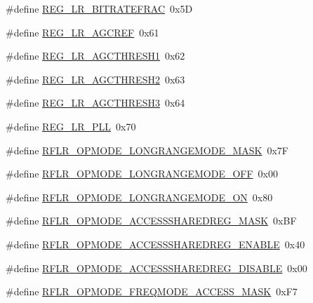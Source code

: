 \begin{DoxyCompactItemize}
\item 
\#define \mbox{\hyperlink{sx1276_regs-_lo_ra_8h_ab2660874b741525fc0424f8b0c59fb00}{R\+E\+G\+\_\+\+L\+R\+\_\+\+B\+I\+T\+R\+A\+T\+E\+F\+R\+AC}}~0x5D
\item 
\#define \mbox{\hyperlink{sx1276_regs-_lo_ra_8h_a3ad00cd303907ff68744172e6bf219c8}{R\+E\+G\+\_\+\+L\+R\+\_\+\+A\+G\+C\+R\+EF}}~0x61
\item 
\#define \mbox{\hyperlink{sx1276_regs-_lo_ra_8h_a5b15d639723d2681ebaa2d5f31286ce5}{R\+E\+G\+\_\+\+L\+R\+\_\+\+A\+G\+C\+T\+H\+R\+E\+S\+H1}}~0x62
\item 
\#define \mbox{\hyperlink{sx1276_regs-_lo_ra_8h_a58a2478774db4cf2ff4bdc89c7f29eff}{R\+E\+G\+\_\+\+L\+R\+\_\+\+A\+G\+C\+T\+H\+R\+E\+S\+H2}}~0x63
\item 
\#define \mbox{\hyperlink{sx1276_regs-_lo_ra_8h_a546cd6aa87137c48b5c98c5973f6f8de}{R\+E\+G\+\_\+\+L\+R\+\_\+\+A\+G\+C\+T\+H\+R\+E\+S\+H3}}~0x64
\item 
\#define \mbox{\hyperlink{sx1276_regs-_lo_ra_8h_a59ec52cf30ae082fee02bdf04a95dcf8}{R\+E\+G\+\_\+\+L\+R\+\_\+\+P\+LL}}~0x70
\item 
\#define \mbox{\hyperlink{sx1276_regs-_lo_ra_8h_a4f5c6acc1ecbded1e724e4d8d4614a4d}{R\+F\+L\+R\+\_\+\+O\+P\+M\+O\+D\+E\+\_\+\+L\+O\+N\+G\+R\+A\+N\+G\+E\+M\+O\+D\+E\+\_\+\+M\+A\+SK}}~0x7F
\item 
\#define \mbox{\hyperlink{sx1276_regs-_lo_ra_8h_abb6cc4dc044295367651d11fb77508bd}{R\+F\+L\+R\+\_\+\+O\+P\+M\+O\+D\+E\+\_\+\+L\+O\+N\+G\+R\+A\+N\+G\+E\+M\+O\+D\+E\+\_\+\+O\+FF}}~0x00
\item 
\#define \mbox{\hyperlink{sx1276_regs-_lo_ra_8h_a4d9b59767f3e421ed4b6a5857c1007bf}{R\+F\+L\+R\+\_\+\+O\+P\+M\+O\+D\+E\+\_\+\+L\+O\+N\+G\+R\+A\+N\+G\+E\+M\+O\+D\+E\+\_\+\+ON}}~0x80
\item 
\#define \mbox{\hyperlink{sx1276_regs-_lo_ra_8h_a01598cd825d7b0a773e420ba4811067c}{R\+F\+L\+R\+\_\+\+O\+P\+M\+O\+D\+E\+\_\+\+A\+C\+C\+E\+S\+S\+S\+H\+A\+R\+E\+D\+R\+E\+G\+\_\+\+M\+A\+SK}}~0x\+BF
\item 
\#define \mbox{\hyperlink{sx1276_regs-_lo_ra_8h_a32305e7842ed6a5e27dea62504bb59da}{R\+F\+L\+R\+\_\+\+O\+P\+M\+O\+D\+E\+\_\+\+A\+C\+C\+E\+S\+S\+S\+H\+A\+R\+E\+D\+R\+E\+G\+\_\+\+E\+N\+A\+B\+LE}}~0x40
\item 
\#define \mbox{\hyperlink{sx1276_regs-_lo_ra_8h_ad9b5fa39ecfbad14292001a38b5db44d}{R\+F\+L\+R\+\_\+\+O\+P\+M\+O\+D\+E\+\_\+\+A\+C\+C\+E\+S\+S\+S\+H\+A\+R\+E\+D\+R\+E\+G\+\_\+\+D\+I\+S\+A\+B\+LE}}~0x00
\item 
\#define \mbox{\hyperlink{sx1276_regs-_lo_ra_8h_af78146c81e7e2c1d15a3c1f487fc8237}{R\+F\+L\+R\+\_\+\+O\+P\+M\+O\+D\+E\+\_\+\+F\+R\+E\+Q\+M\+O\+D\+E\+\_\+\+A\+C\+C\+E\+S\+S\+\_\+\+M\+A\+SK}}~0x\+F7

\end{DoxyCompactItemize}
